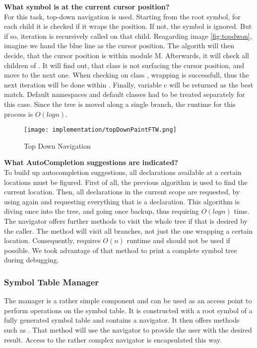 \textbf{What symbol is at the current cursor position?}\\
For this task, top-down navigation is used.
Starting from the root symbol, for each child it is checked if it wraps the position.
If not, the symbol is ignored.
But if so, iteration is recursively called on that child.
Reagarding image \ref{fig:topdwon}, imagine we hand the blue line as the cursor position.
The algorith will then decide, that the cursor position is within module M.
Afterwards, it will check all children of .
It will find out, that class  is not surfacing the cursor position, and move to the next one.
When checking on class , wrapping is successfull, thus the next iteration will be done within .
Finally, variable c will be returned as the best match.
Default namespaces and default classes had to be treated separately for this case.
Since the tree is moved along a single branch, the runtime for this process is $O(logn)$.\\

\begin{figure}[h]
    \centering
    \texttt{[image: implementation/topDownPaintFTW.png]}
    \caption{Top Down Navigation}
    \label{fig:findDecl}
\end{figure}


\textbf{What AutoCompletion suggestions are indicated?}\\
To build up autocompletion suggestions, all declarations available at a certain locations must be figured.
First of all, the previous  algorithm is used to find the current location.
Then, all declarations in the current scope are requested, by using  again and requesting everything that is a declaration.
This algorithm is diving once into the tree, and going once backup, thus requiring $O(logn)$ time.\\

The navigator offers further methods to visit the whole tree if that is desired by the caller.
The method  will visit all branches, not just the one wrapping a certain location.
Consequently,  requires $O(n)$ runtime and should not be used if possible.
We took advantage of that method to print a complete symbol tree during debugging.



\subsubsection{Symbol Table Manager}
The manager is a rather simple component and can be used as an access point to perform operations on the symbol table.
It is constructed with a root symbol of a fully generated symbol table and contains a navigator.
It then offers methods such as .
That method will use the navigator to provide the user with the desired result.
Access to the rather complex navigator is encapsulated this way.

